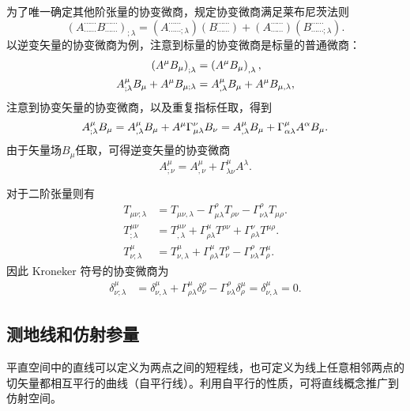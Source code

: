\documentclass[11pt, a4paper, oneside, onecolumn]{ctexart}
\numberwithin{equation}{subsection}
\begin{document}
为了唯一确定其他阶张量的协变微商，规定协变微商满足莱布尼茨法则
\begin{equation}
\left(A_{\cdots\cdots}^{\cdots\cdots}B_{\cdots\cdots}^{\cdots\cdots}\right)_{;\lambda}=\left(A_{\cdots\cdots;\lambda}^{\cdots\cdots}\right)\left(B_{\cdots\cdots}^{\cdots\cdots}\right)+\left(A_{\cdots\cdots}^{\cdots\cdots}\right)\left(B_{\cdots\cdots;\lambda}^{\cdots\cdots}\right).
\end{equation}
以逆变矢量的协变微商为例，注意到标量的协变微商是标量的普通微商：
\begin{align}
\left(A^{\mu}B_{\mu}\right)_{;\lambda}&=\left(A^{\mu}B_{\mu}\right)_{,\lambda},\\
A_{;\lambda}^{\mu}B_{\mu}+A^{\mu}B_{\mu;\lambda}&=A_{,\lambda}^{\mu}B_{\mu}+A^{\mu}B_{\mu,\lambda},\notag
\end{align}
注意到协变矢量的协变微商，以及重复指标任取，得到
\begin{equation}
A_{;\lambda}^{\mu}B_{\mu}=A_{,\lambda}^{\mu}B_{\mu}+A^{\mu}\Gamma_{\mu\lambda}^{\nu}B_{\nu}=A^{\mu}_{,\lambda}B_{\mu}+\Gamma_{\alpha\lambda}^{\mu}A^{\alpha}B_{\mu}.\notag
\end{equation}
由于矢量场$B_{\mu}$任取，可得逆变矢量的协变微商
\begin{equation}
A_{;\nu}^{\mu}=A_{,\nu}^{\mu}+\Gamma_{\lambda\nu}^{\mu}A^{\lambda}.
\end{equation}

对于二阶张量则有
\begin{align}
T_{\mu\nu;\lambda}&=T_{\mu\nu,\lambda}-\Gamma_{\mu\lambda}^{\rho}T_{\rho\nu}-\Gamma_{\nu\lambda}^{\rho}T_{\mu\rho}.\\
T_{;\lambda}^{\mu\nu}&=T_{,\lambda}^{\mu\nu}+\Gamma_{\rho\lambda}^{\mu}T^{\rho\nu}+\Gamma_{\rho\lambda}^{\nu}T^{\mu\rho}.\\
T_{\nu;\lambda}^{\mu}&=T_{\nu,\lambda}^{\mu}+\Gamma_{\rho\lambda}^{\mu}T_{\nu}^{\rho}-\Gamma_{\nu\lambda}^{\rho}T_{\rho}^{\mu}.
\end{align}
因此 Kroneker 符号的协变微商为
\begin{align}
\delta{}_{\nu;\lambda}^{\mu}&=\delta{}_{\nu,\lambda}^{\mu}+\Gamma_{\rho\lambda}^{\mu}\delta{}_{\nu}^{\rho}-\Gamma_{\nu\lambda}^{\rho}\delta{}_{\rho}^{\mu}=\delta{}_{\nu,\lambda}^{\mu}=0.
\end{align}

\subsection{测地线和仿射参量}
平直空间中的直线可以定义为两点之间的短程线，也可定义为线上任意相邻两点的切矢量都相互平行的曲线（自平行线）。利用自平行的性质，可将直线概念推广到仿射空间。
\end{document}
